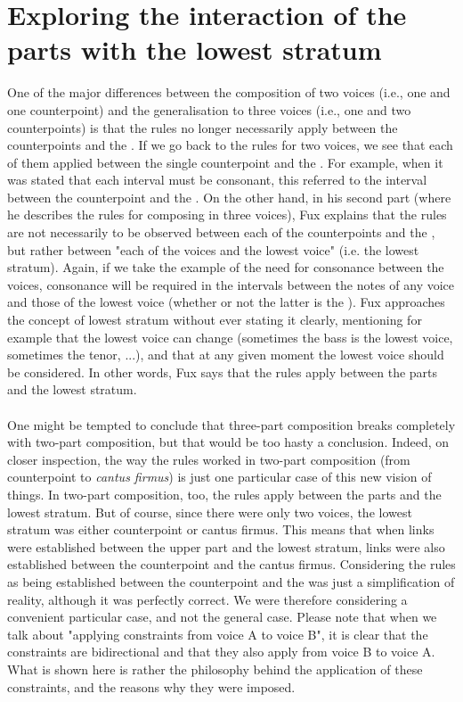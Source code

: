 \section{Exploring the interaction of the parts with the lowest stratum}

One of the major differences between the composition of two voices (i.e., one \cfs and one counterpoint) and the generalisation to three voices (i.e., one \cfs and two counterpoints) is that the rules no longer necessarily apply between the counterpoints and the \cf. If we go back to the rules for two voices, we see that each of them applied between the single counterpoint and the \cf. For example, when it was stated that each interval must be consonant, this referred to the interval between the counterpoint and the \cf.
On the other hand, in his second part (where he describes the rules for composing in three voices), Fux explains that the rules are not necessarily to be observed between each of the counterpoints and the \cf, but rather between "each of the voices and the lowest voice" (i.e. the lowest stratum). Again, if we take the example of the need for consonance between the voices, consonance will be required in the intervals between the notes of any voice and those of the lowest voice (whether or not the latter is the \cf).
Fux approaches the concept of lowest stratum without ever stating it clearly, mentioning for example that the lowest voice can change (sometimes the bass is the lowest voice, sometimes the tenor, ...), and that at any given moment the lowest voice should be considered. In other words, Fux says that the rules apply between the parts and the lowest stratum.

\paragraph{}
One might be tempted to conclude that three-part composition breaks completely with two-part composition, but that would be too hasty a conclusion. Indeed, on closer inspection, the way the rules worked in two-part composition (from counterpoint to \textit{cantus firmus}) is just one particular case of this new vision of things. In two-part composition, too, the rules apply between the parts and the lowest stratum. But of course, since there were only two voices, the lowest stratum was either counterpoint or cantus firmus. This means that when links were established between the upper part and the lowest stratum, links were also established between the counterpoint and the cantus firmus. Considering the rules as being established between the counterpoint and the \cfs was just a simplification of reality, although it was perfectly correct. We were therefore considering a convenient particular case, and not the general case. Please note that when we talk about "applying constraints from voice A to voice B", it is clear that the constraints are bidirectional and that they also apply from voice B to voice A. What is shown here is rather the philosophy behind the application of these constraints, and the reasons why they were imposed.

